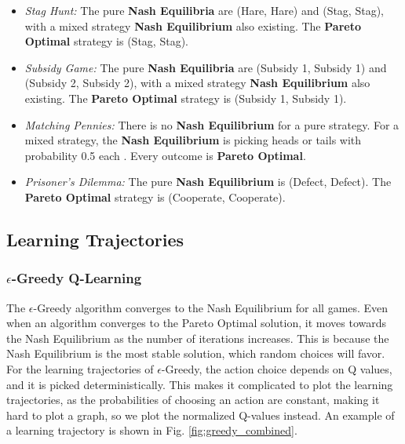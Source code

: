 \documentclass[12pt,a4paper, onecolumn]{exam}
\begin{document}
\begin{itemize}
    \item \textit{Stag Hunt:}
          The pure \textbf{Nash Equilibria} are (Hare, Hare) and (Stag, Stag), with a mixed strategy \textbf{Nash Equilibrium} also existing. %
          The \textbf{Pareto Optimal} strategy is (Stag, Stag).

    \item \textit{Subsidy Game:}
          The pure \textbf{Nash Equilibria} are (Subsidy 1, Subsidy 1) and (Subsidy 2, Subsidy 2), with a mixed strategy \textbf{Nash Equilibrium} also existing. %
          The \textbf{Pareto Optimal} strategy is (Subsidy 1, Subsidy 1).

    \item \textit{Matching Pennies:}
          There is no \textbf{Nash Equilibrium} for a pure strategy. For a mixed strategy, the \textbf{Nash Equilibrium} is picking heads or tails with probability 0.5 each \cite{shoham}.
          Every outcome is \textbf{Pareto Optimal}.

    \item \textit{Prisoner's Dilemma:}
          The pure \textbf{Nash Equilibrium} is (Defect, Defect).
          The \textbf{Pareto Optimal} strategy is (Cooperate, Cooperate).
\end{itemize}

\subsection{Learning Trajectories}
\subsubsection{$\epsilon$-Greedy Q-Learning}
The $\epsilon$-Greedy algorithm converges to the Nash Equilibrium for all games. Even when an algorithm converges to the Pareto Optimal solution, it moves towards the Nash Equilibrium
as the number of iterations increases. This is because the Nash Equilibrium is the most stable solution, which random choices will favor. For the learning trajectories of $\epsilon$-Greedy,
the action choice depends on Q values, and it is picked deterministically. This makes it complicated to plot the learning trajectories, as the probabilities of choosing an action are
constant, making it hard to plot a graph, so we plot the normalized Q-values instead. An example of a learning trajectory is shown in Fig. \ref{fig:greedy_combined}.
\end{document}
